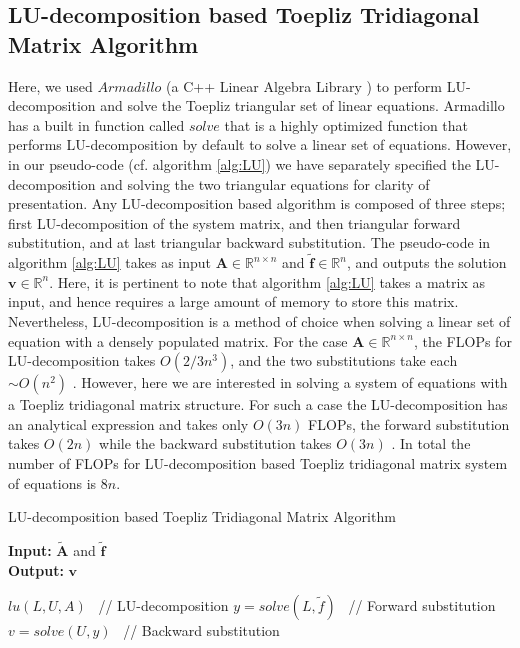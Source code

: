 \documentclass[a4paper]{article}
\begin{document}
\subsection{LU-decomposition based Toepliz Tridiagonal Matrix Algorithm}
Here, we used $Armadillo$ (a C++ Linear Algebra Library \cite{Arma}) to perform LU-decomposition and solve the Toepliz triangular set of linear equations. Armadillo has a built in function called $solve$ that is a highly optimized function that performs LU-decomposition by default to solve a linear set of equations. However, in our pseudo-code (cf. algorithm \ref{alg:LU}) we have separately specified the LU-decomposition and solving the two triangular equations for clarity of presentation. Any LU-decomposition based algorithm is composed of three steps; first LU-decomposition of the system matrix, and then triangular forward substitution, and at last triangular backward substitution. The pseudo-code in algorithm \ref{alg:LU} takes as input $\mathbf{A}\in\mathbb{R}^{n\times n}$ and $\mathbf{\tilde{f}}\in\mathbb{R}^{n}$, and outputs the solution $\mathbf{v}\in\mathbb{R}^{n}$. Here, it is pertinent to note that algorithm \ref{alg:LU} takes a matrix as input, and hence requires a large amount of memory to store this matrix. Nevertheless, LU-decomposition is a method of choice when solving a linear set of equation with a densely populated matrix. For the case $\mathbf{A}\in\mathbb{R}^{n\times n}$, the FLOPs for LU-decomposition takes $O(2/3n^3)$, and the two substitutions take each $\sim O(n^2)$ \cite{Comp}. However, here we are interested in solving a system of equations with a Toepliz tridiagonal matrix structure. For such a case the LU-decomposition has an analytical expression and takes only $O(3n)$ FLOPs, the forward substitution takes $O(2n)$ while the backward substitution takes $O(3n)$ \cite{PresTeukVettFlan92}. In total the number of FLOPs for LU-decomposition based Toepliz tridiagonal matrix system of equations is $8n$.

\begin{algorithm}[H]
\caption{LU-decomposition based Toepliz Tridiagonal Matrix Algorithm}\label{alg:LU}
\textbf{Input:} $\mathbf{\tilde{A}}$ and $\mathbf{\tilde{f}}$ \\
\textbf{Output:} $\mathbf{v}$
\begin{algorithmic}
	\State $lu(L,U,A)$ \      \qquad// LU-decomposition 
    \State $y = solve(L,\tilde{f})$ \ \qquad// Forward substitution 
    \State $v = solve(U,y)$ \ \qquad// Backward substitution 
\end{algorithmic}
\end{algorithm}
\end{document}
